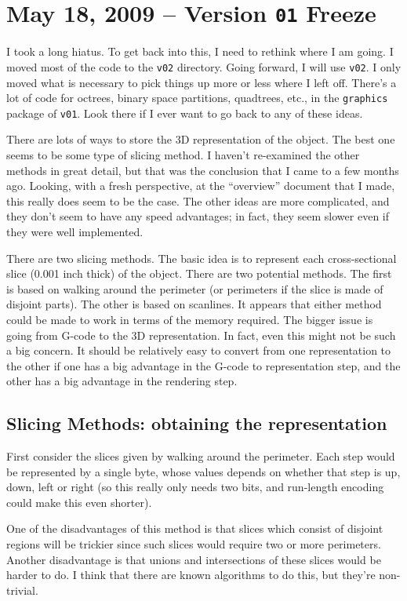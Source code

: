 \documentclass[titlepage,oneside,10pt]{article}
\begin{document}
\section{May 18, 2009 -- Version {\tt 01} Freeze}

I took a long hiatus. To get back into this, I need to rethink where I
am going. I moved most of the code to the {\tt v02} directory. Going
forward, I will use {\tt v02}. I only moved what is necessary to pick
things up more or less where I left off. There's a lot of code for
octrees, binary space partitions, quadtrees, etc., in the 
{\tt graphics} package of {\tt v01}. Look there if I ever want to go back
to any of these ideas.

There are lots of ways to store the 3D representation of the
object. The best one seems to be some type of slicing method. I
haven't re-examined the other methods in great detail, but that was
the conclusion that I came to a few months ago. Looking, with a fresh
perspective, at the ``overview'' document that I made, this
really does seem to be the case. The other ideas are more
complicated, and they don't seem to have any speed advantages; in
fact, they seem slower even if they were well implemented.

There are two slicing methods. The basic idea is to represent each
cross-sectional slice (0.001 inch thick) of the object. There are two
potential methods. The first is based on walking around the
perimeter (or perimeters if the slice is made of disjoint parts). The
other is based on scanlines. It appears that either method could be
made to work in terms of the memory required. The bigger issue is
going from G-code to the 3D representation. In fact, even this might
not be such a big concern. It should be relatively easy to convert
from one representation to the other if one has a big advantage in the
G-code to representation step, and the other has a big advantage in
the rendering step.

\subsection{Slicing Methods: obtaining the representation}

First consider the slices given by walking around the
perimeter. Each step would be represented by a single byte, whose
values depends on whether that step is up, down, left or right (so
this really only needs two bits, and run-length encoding could make
this even shorter).

One of the disadvantages of this method is that slices which consist
of disjoint regions will be trickier since such slices would require
two or more perimeters. Another disadvantage is that unions and
intersections of these slices would be harder to do. I think
that there are known algorithms to do this, but they're non-trivial.
\end{document}
